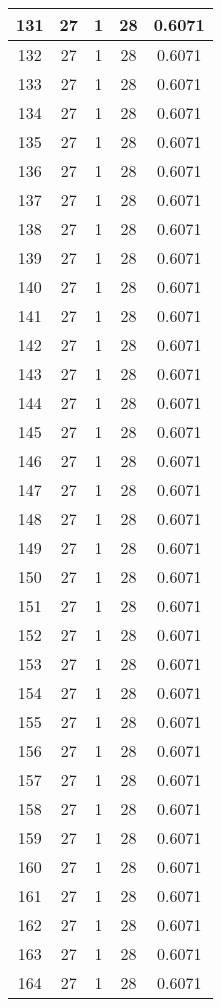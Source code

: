 \documentclass[letterpaper, 12pt]{article}
\begin{document}
\begin{longtable}{|c|c|c|c|c|}
\hline
131 & 27 & 1 & 28 & 0.6071 \\
\hline
132 & 27 & 1 & 28 & 0.6071 \\
\hline
133 & 27 & 1 & 28 & 0.6071 \\
\hline
134 & 27 & 1 & 28 & 0.6071 \\
\hline
135 & 27 & 1 & 28 & 0.6071 \\
\hline
136 & 27 & 1 & 28 & 0.6071 \\
\hline
137 & 27 & 1 & 28 & 0.6071 \\
\hline
138 & 27 & 1 & 28 & 0.6071 \\
\hline
139 & 27 & 1 & 28 & 0.6071 \\
\hline
140 & 27 & 1 & 28 & 0.6071 \\
\hline
141 & 27 & 1 & 28 & 0.6071 \\
\hline
142 & 27 & 1 & 28 & 0.6071 \\
\hline
143 & 27 & 1 & 28 & 0.6071 \\
\hline
144 & 27 & 1 & 28 & 0.6071 \\
\hline
145 & 27 & 1 & 28 & 0.6071 \\
\hline
146 & 27 & 1 & 28 & 0.6071 \\
\hline
147 & 27 & 1 & 28 & 0.6071 \\
\hline
148 & 27 & 1 & 28 & 0.6071 \\
\hline
149 & 27 & 1 & 28 & 0.6071 \\
\hline
150 & 27 & 1 & 28 & 0.6071 \\
\hline
151 & 27 & 1 & 28 & 0.6071 \\
\hline
152 & 27 & 1 & 28 & 0.6071 \\
\hline
153 & 27 & 1 & 28 & 0.6071 \\
\hline
154 & 27 & 1 & 28 & 0.6071 \\
\hline
155 & 27 & 1 & 28 & 0.6071 \\
\hline
156 & 27 & 1 & 28 & 0.6071 \\
\hline
157 & 27 & 1 & 28 & 0.6071 \\
\hline
158 & 27 & 1 & 28 & 0.6071 \\
\hline
159 & 27 & 1 & 28 & 0.6071 \\
\hline
160 & 27 & 1 & 28 & 0.6071 \\
\hline
161 & 27 & 1 & 28 & 0.6071 \\
\hline
162 & 27 & 1 & 28 & 0.6071 \\
\hline
163 & 27 & 1 & 28 & 0.6071 \\
\hline
164 & 27 & 1 & 28 & 0.6071 \\

\end{longtable}
\end{document}
